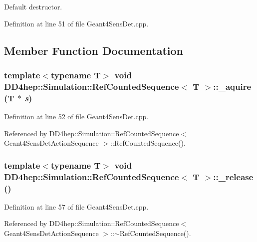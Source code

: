 Default destructor. 

Definition at line 51 of file Geant4SensDet.cpp.

\subsection{Member Function Documentation}
\hypertarget{class_d_d4hep_1_1_simulation_1_1_ref_counted_sequence_a186785a2a36bfb4dd0468978f4883328}{
\subsubsection[{\_\-aquire}]{\setlength{\rightskip}{0pt plus 5cm}template$<$typename T$>$ void {\bf DD4hep::Simulation::RefCountedSequence}$<$ {\bf T} $>$::\_\-aquire ({\bf T} $\ast$ {\em s})}}
\label{class_d_d4hep_1_1_simulation_1_1_ref_counted_sequence_a186785a2a36bfb4dd0468978f4883328}


Definition at line 52 of file Geant4SensDet.cpp.

Referenced by DD4hep::Simulation::RefCountedSequence$<$ Geant4SensDetActionSequence $>$::RefCountedSequence().\hypertarget{class_d_d4hep_1_1_simulation_1_1_ref_counted_sequence_a81c7e6e88d05887495b28cded6899da9}{
\subsubsection[{\_\-release}]{\setlength{\rightskip}{0pt plus 5cm}template$<$typename T$>$ void {\bf DD4hep::Simulation::RefCountedSequence}$<$ {\bf T} $>$::\_\-release ()}}
\label{class_d_d4hep_1_1_simulation_1_1_ref_counted_sequence_a81c7e6e88d05887495b28cded6899da9}


Definition at line 57 of file Geant4SensDet.cpp.

Referenced by DD4hep::Simulation::RefCountedSequence$<$ Geant4SensDetActionSequence $>$::$\sim$RefCountedSequence().

